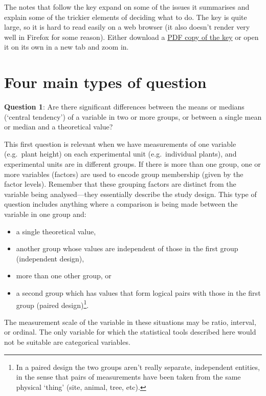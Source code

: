 \documentclass[
]{book}
\providecommand{\tightlist}{%
  \setlength{\itemsep}{0pt}\setlength{\parskip}{0pt}}
\begin{document}
The notes that follow the key expand on some of the issues it summarises and explain some of the trickier elements of deciding what to do. The key is quite large, so it is hard to read easily on a web browser (it also doesn't render very well in Firefox for some reason). Either download a \href{./images/stats_key.pdf}{PDF copy of the key} or open it on its own in a new tab and zoom in.

\hypertarget{four-questions}{%
\section{Four main types of question}\label{four-questions}}

\textbf{Question 1}: Are there significant differences between the means or medians (`central tendency') of a variable in two or more groups, or between a single mean or median and a theoretical value?

This first question is relevant when we have measurements of one variable (e.g.~plant height) on each experimental unit (e.g.~individual plants), and experimental units are in different groups. If there is more than one group, one or more variables (factors) are used to encode group membership (given by the factor levels). Remember that these grouping factors are distinct from the variable being analysed---they essentially describe the study design. This type of question includes anything where a comparison is being made between the variable in one group and:

\begin{itemize}
\tightlist
\item
  a single theoretical value,
\item
  another group whose values are independent of those in the first group (independent design),
\item
  more than one other group, or
\item
  a second group which has values that form logical pairs with those in the first group (paired design)\footnote{In a paired design the two groups aren't really separate, independent entities, in the sense that pairs of measurements have been taken from the same physical `thing' (site, animal, tree, etc).}.
\end{itemize}

The measurement scale of the variable in these situations may be ratio, interval, or ordinal. The only variable for which the statistical tools described here would not be suitable are categorical variables.
\end{document}
